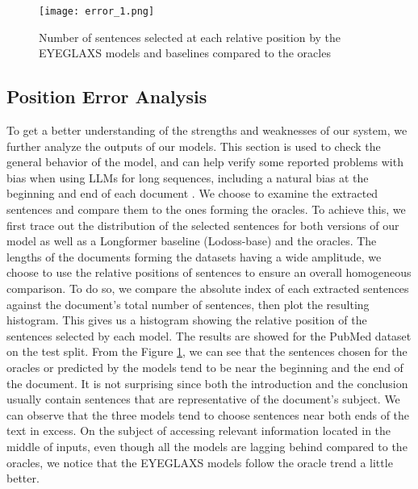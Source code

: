\begin{figure}
    \centering
    \texttt{[image: error\_1.png]}
    \caption{Number of sentences selected at each relative position by the EYEGLAXS models and baselines compared to the oracles}
    \label{fig:fig_err_1}
\end{figure}

\subsection{Position Error Analysis}

To get a better understanding of the strengths and weaknesses of our system, we further analyze the outputs of our models.
This section is used to check the general behavior of the model, and can help verify some reported problems with bias when using LLMs for long sequences, including a natural bias at the beginning and end of each document \cite{liu2023lost}. We choose to examine the extracted sentences and compare them to the ones forming the oracles.
To achieve this, we first trace out the distribution of the selected sentences for both versions of our model as well as a Longformer baseline (Lodoss-base) \cite{cho-etal-2022-toward} and the oracles. %
The lengths of the documents forming the datasets having a wide amplitude, we choose to use the relative positions of sentences to ensure an overall homogeneous comparison. To do so, we compare the absolute index of each extracted sentences against the document’s total number of sentences, then plot the resulting histogram. This gives us a histogram showing the relative position of the sentences selected by each model. The results are showed for the PubMed dataset on the test split. %
From the Figure \ref{fig:fig_err_1}, we can see that the sentences chosen for the oracles or predicted by the models tend to be near the beginning and the end of the document. It is not surprising since both the introduction and the conclusion usually contain sentences that are representative of the document's subject. We can observe that the three models tend to choose sentences near both ends of the text in excess. On the subject of accessing relevant information located in the middle of inputs, even though all the models are lagging behind compared to the oracles, we notice that the EYEGLAXS models follow the oracle trend a little better.%

